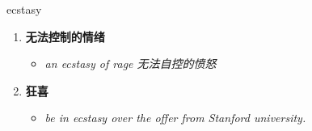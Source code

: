 
\begin{frame}
{\huge ecstasy}
\begin{center}
\begin{enumerate}\Large
  \item \textbf{无法控制的情绪}
  \begin{itemize}
    \item \em{\Large{an ecstasy of rage 无法自控的愤怒}}
  \end{itemize}
  \item \textbf{狂喜}
  \begin{itemize}
    \item \em{\Large{be in ecstasy over the offer from Stanford university.}}
  \end{itemize}
\end{enumerate}
\end{center}
\end{frame}
